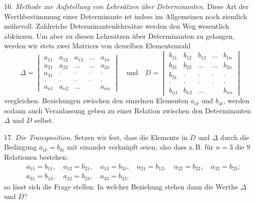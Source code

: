 \documentclass[11pt]{article}
\let\Delta\varDelta
\begin{document}
16. \textit{Methode zur Aufstellung von Lehrsätzen über Determinanten.} Diese Art der Werthbestimmung einer Determinante ist indess im Allgemeinen noch ziemlich mühevoll. Zahlreiche Determinantenlehrsätze werden den Weg wesentlich abkürzen. Um aber zu diesen Lehrsätzen über Determinanten zu gelangen, werden wir stets zwei Matrices von derselben Elementenzahl
\[
\Delta = \begin{vmatrix}
a_{11} & a_{12} & a_{13} & \ldots & a_{1n}\\
a_{21} & a_{22} & \ldots & \ldots & a_{2n}\\
a_{31} & \cdot & \cdot & \cdot & \cdot\\
\cdot & \cdot & \cdot & \cdot & \cdot\\
a_{n1} & a_{n2} & \ldots & & a_{nn}
\end{vmatrix}
\quad\text{und}\quad
D = \begin{vmatrix}
b_{11} & b_{12} & b_{13} & \ldots & b_{1n}\\
b_{21} & b_{22} & \ldots & \ldots & b_{2n}\\
b_{31} & \cdot & \cdot & \cdot & \cdot\\
\cdot & \cdot & \cdot & \cdot & \cdot\\
b_{n1} & b_{n2} & \ldots & & b_{nn}
\end{vmatrix}
\]
vergleichen. Beziehungen zwischen den einzelnen Elementen $a_{ik}$ und $b_{ik}$, werden sodann auch Veranlassung geben zu einer Relation zwischen den Determinanten $\Delta$ und $D$ selbst.

17. \textit{Die Transposition.} Setzen wir fest, dass die Elemente in $D$ und $\Delta$ durch die Bedingung $a_{ik}=b_{ki}$ mit einander verknüpft seien, also dass z.\,B. für $n=3$ die 9 Relationen bestehen:
\[
\begin{aligned}
&a_{11}=b_{11}, \quad a_{12}=b_{21}, \quad a_{13}=b_{31}; \quad a_{21}=b_{12}, \quad a_{22}=b_{22}, \quad a_{32}=b_{23};\\
&a_{31}=b_{13}, \quad a_{32}=b_{23}, \quad a_{33}=b_{33},
\end{aligned}
\]
so lässt sich die Frage stellen: In welcher Beziehung stehen dann die Werthe $\Delta$ und $D$?
\end{document}
